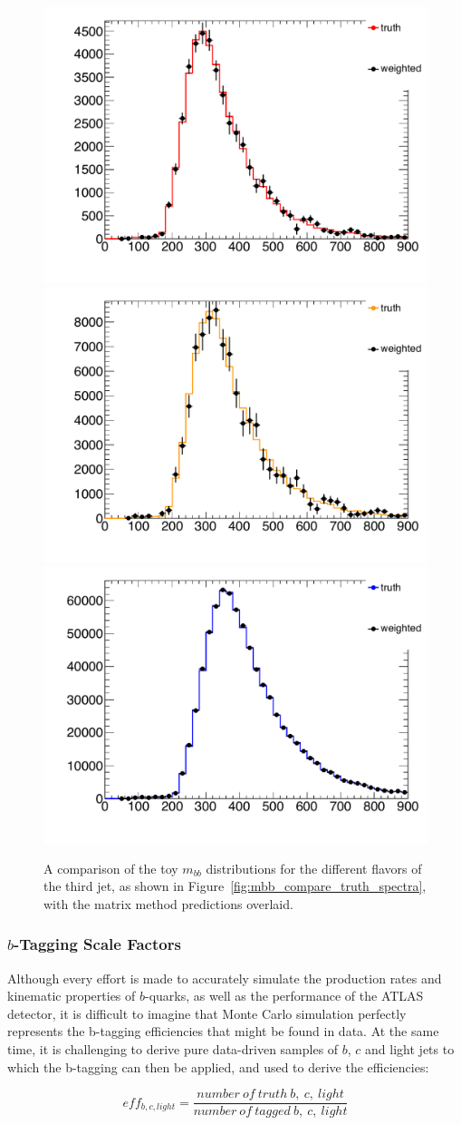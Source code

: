 \begin{figure}
    \centering
    \includegraphics[width=0.3\linewidth]{Systematics/mm_shape_check_b.pdf}
    \includegraphics[width=0.3\linewidth]{Systematics/mm_shape_check_c.pdf}
    \includegraphics[width=0.3\linewidth]{Systematics/mm_shape_check_light.pdf}
    \caption{A comparison of the toy $m_{bb}$ distributions for the different flavors of the
        third jet, as shown in Figure~\ref{fig:mbb_compare_truth_spectra}, with the matrix
        method predictions overlaid.  }
    \label{fig:mbb_compare_truth_mm_toy}
\end{figure}


\subsubsection{$b$-Tagging Scale Factors}
\label{sec:SF}
Although every effort is made to accurately simulate the production rates and
kinematic properties of $b$-quarks, as well as the performance of the ATLAS
detector, it is difficult to imagine that Monte Carlo simulation perfectly represents
the b-tagging efficiencies that might be found in data.  At the same time, it
is challenging to derive pure data-driven samples of $b$, $c$ and light jets to which
the b-tagging can then be applied, and used to derive the efficiencies:

    \begin{equation}
        eff_{b,c,light}=\frac{number\ of\ truth\ b,\ c,\ light}{number\ of\ tagged\ b,\ c,\ light}
    \end{equation}

